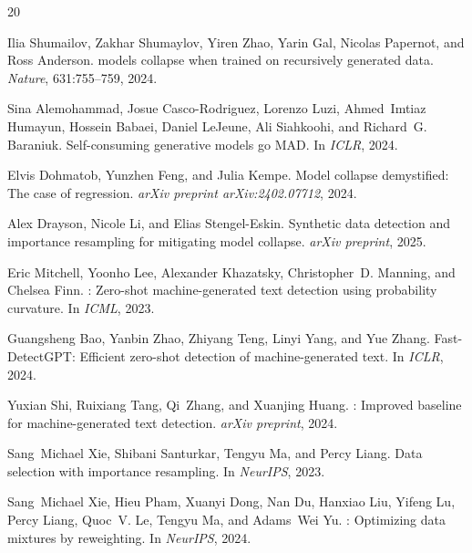 \documentclass[11pt]{article}
\begin{document}
\begin{thebibliography}{20}

Ilia Shumailov, Zakhar Shumaylov, Yiren Zhao, Yarin Gal, Nicolas Papernot, and Ross Anderson.
 models collapse when trained on recursively generated data.
\newblock \emph{Nature}, 631:755--759, 2024.

Sina Alemohammad, Josue Casco-Rodriguez, Lorenzo Luzi, Ahmed~Imtiaz Humayun, Hossein Babaei, Daniel LeJeune, Ali Siahkoohi, and Richard~G. Baraniuk.
\newblock Self-consuming generative models go {MAD}.
\newblock In \emph{ICLR}, 2024.

Elvis Dohmatob, Yunzhen Feng, and Julia Kempe.
\newblock Model collapse demystified: The case of regression.
\newblock \emph{arXiv preprint arXiv:2402.07712}, 2024.

Alex Drayson, Nicole Li, and Elias Stengel-Eskin.
\newblock Synthetic data detection and importance resampling for mitigating model collapse.
\newblock \emph{arXiv preprint}, 2025.

Eric Mitchell, Yoonho Lee, Alexander Khazatsky, Christopher~D. Manning, and Chelsea Finn.
: Zero-shot machine-generated text detection using probability curvature.
\newblock In \emph{ICML}, 2023.

Guangsheng Bao, Yanbin Zhao, Zhiyang Teng, Linyi Yang, and Yue Zhang.
\newblock Fast-{DetectGPT}: Efficient zero-shot detection of machine-generated text.
\newblock In \emph{ICLR}, 2024.

Yuxian Shi, Ruixiang Tang, Qi~Zhang, and Xuanjing Huang.
: Improved baseline for machine-generated text detection.
\newblock \emph{arXiv preprint}, 2024.

Sang~Michael Xie, Shibani Santurkar, Tengyu Ma, and Percy Liang.
\newblock Data selection with importance resampling.
\newblock In \emph{NeurIPS}, 2023.

Sang~Michael Xie, Hieu Pham, Xuanyi Dong, Nan Du, Hanxiao Liu, Yifeng Lu, Percy Liang, Quoc~V. Le, Tengyu Ma, and Adams~Wei Yu.
: Optimizing data mixtures by reweighting.
\newblock In \emph{NeurIPS}, 2024.


\end{thebibliography}
\end{document}
